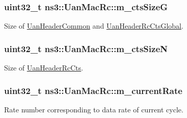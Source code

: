 \subsubsection[{\texorpdfstring{m\+\_\+cts\+SizeG}{m_ctsSizeG}}]{\setlength{\rightskip}{0pt plus 5cm}uint32\+\_\+t ns3\+::\+Uan\+Mac\+Rc\+::m\+\_\+cts\+SizeG\hspace{0.3cm}{\ttfamily [private]}}\hypertarget{classns3_1_1UanMacRc_a96148aed86bf6b4ddf7b09e0bd3d478a}{}\label{classns3_1_1UanMacRc_a96148aed86bf6b4ddf7b09e0bd3d478a}


Size of \hyperlink{classns3_1_1UanHeaderCommon}{Uan\+Header\+Common} and \hyperlink{classns3_1_1UanHeaderRcCtsGlobal}{Uan\+Header\+Rc\+Cts\+Global}. 

\subsubsection[{\texorpdfstring{m\+\_\+cts\+SizeN}{m_ctsSizeN}}]{\setlength{\rightskip}{0pt plus 5cm}uint32\+\_\+t ns3\+::\+Uan\+Mac\+Rc\+::m\+\_\+cts\+SizeN\hspace{0.3cm}{\ttfamily [private]}}\hypertarget{classns3_1_1UanMacRc_a65eed8331ecf955702294cdbf47897d8}{}\label{classns3_1_1UanMacRc_a65eed8331ecf955702294cdbf47897d8}


Size of \hyperlink{classns3_1_1UanHeaderRcCts}{Uan\+Header\+Rc\+Cts}. 

\subsubsection[{\texorpdfstring{m\+\_\+current\+Rate}{m_currentRate}}]{\setlength{\rightskip}{0pt plus 5cm}uint32\+\_\+t ns3\+::\+Uan\+Mac\+Rc\+::m\+\_\+current\+Rate\hspace{0.3cm}{\ttfamily [private]}}\hypertarget{classns3_1_1UanMacRc_a994d8477f32862d6fa549e1782a8b699}{}\label{classns3_1_1UanMacRc_a994d8477f32862d6fa549e1782a8b699}


Rate number corresponding to data rate of current cycle. 

